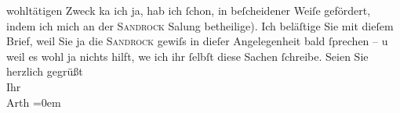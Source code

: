 \begin{ledgroupsized}[t]{13cm}
               wohltätigen Zweck ka{\geminationn} ich ja, hab ich ſchon, in
               beſcheidener Weiſe gefördert, indem ich mich an der \textsc{Sandrock} Sa{\geminationm}lung betheilige{\dotstwo}).
               Ich beläſtige Sie {\pb}mit dieſem Brief, weil Sie
               ja die \textsc{Sandrock} gewiſs in dieſer Angelegenheit bald ſprechen – u weil es wohl ja nichts hilft,
                  we{\geminationn} ich ihr ſelbſt diese Sachen ſchreibe. \pend
           \pstart
           Seien Sie herzlich gegrüßt {\\[\baselineskip]}Ihr {\\[\baselineskip]}\spacefill\mbox{Arth}\pend
           \leftskip=0em{}
         
         \endnumbering{}\end{ledgroupsized}\begin{anhang}\end{anhang}\newcommand{\dateiname}{L02995}\newcommand{\titel}{Arthur Schnitzler an Felix Salten, 10. 1. 1905}\newcommand{\editorInnen}{Martin Anton Müller und Laura Untner}
      